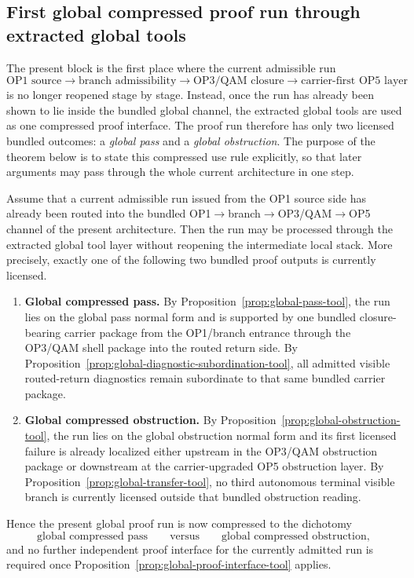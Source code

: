 \subsection{First global compressed proof run through extracted global tools}
\label{sec:first-global-compressed-proof-run-through-extracted-global-tools}

\begin{remark}
The present block is the first place where the current admissible run
\[
\text{OP1 source}
\to
\text{branch admissibility}
\to
\text{OP3/QAM closure}
\to
\text{carrier-first OP5 layer}
\]
is no longer reopened stage by stage. Instead, once the run has already been shown to lie inside the bundled global channel, the extracted global tools are used as one compressed proof interface. The proof run therefore has only two licensed bundled outcomes: a \emph{global pass} and a \emph{global obstruction}. The purpose of the theorem below is to state this compressed use rule explicitly, so that later arguments may pass through the whole current architecture in one step.
\end{remark}

\begin{theorem}
\label{thm:first-global-compressed-proof-run-through-extracted-global-tools}
Assume that a current admissible run issued from the OP1 source side has already been routed into the bundled OP1$\to$branch$\to$OP3/QAM$\to$OP5 channel of the present architecture. Then the run may be processed through the extracted global tool layer without reopening the intermediate local stack. More precisely, exactly one of the following two bundled proof outputs is currently licensed.
\begin{enumerate}[leftmargin=2em,label=(\roman*)]
\item \textbf{Global compressed pass.}
By Proposition~\ref{prop:global-pass-tool}, the run lies on the global pass normal form and is supported by one bundled closure-bearing carrier package from the OP1/branch entrance through the OP3/QAM shell package into the routed return side. By Proposition~\ref{prop:global-diagnostic-subordination-tool}, all admitted visible routed-return diagnostics remain subordinate to that same bundled carrier package.
\item \textbf{Global compressed obstruction.}
By Proposition~\ref{prop:global-obstruction-tool}, the run lies on the global obstruction normal form and its first licensed failure is already localized either upstream in the OP3/QAM obstruction package or downstream at the carrier-upgraded OP5 obstruction layer. By Proposition~\ref{prop:global-transfer-tool}, no third autonomous terminal visible branch is currently licensed outside that bundled obstruction reading.
\end{enumerate}
Hence the present global proof run is now compressed to the dichotomy
\[
\text{global compressed pass}
\qquad\text{versus}\qquad
\text{global compressed obstruction},
\]
and no further independent proof interface for the currently admitted run is required once Proposition~\ref{prop:global-proof-interface-tool} applies.
\end{theorem}

